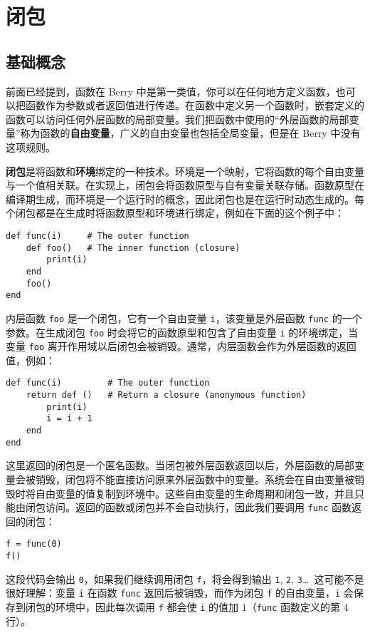 \section{闭包}

\subsection{基础概念}

前面已经提到，函数在 Berry 中是第一类值，你可以在任何地方定义函数，也可以把函数作为参数或者返回值进行传递。在函数中定义另一个函数时，嵌套定义的函数可以访问任何外层函数的局部变量。我们把函数中使用的“外层函数的局部变量”称为函数的\textbf{自由变量}，广义的自由变量也包括全局变量，但是在 Berry 中没有这项规则。

\textbf{闭包}是将函数和\textbf{环境}绑定的一种技术。环境是一个映射，它将函数的每个自由变量与一个值相关联。在实现上，闭包会将函数原型与自有变量关联存储。函数原型在编译期生成，而环境是一个运行时的概念，因此闭包也是在运行时动态生成的。每个闭包都是在生成时将函数原型和环境进行绑定，例如在下面的这个例子中：
\begin{lstlisting}[language=berry]
def func(i)     # The outer function
    def foo()   # The inner function (closure)
        print(i)
    end
    foo()
end
\end{lstlisting}
内层函数 \texttt{foo} 是一个闭包，它有一个自由变量 \texttt{i}，该变量是外层函数 \texttt{func} 的一个参数。在生成闭包 \texttt{foo} 时会将它的函数原型和包含了自由变量 \texttt{i} 的环境绑定，当变量 \texttt{foo} 离开作用域以后闭包会被销毁。通常，内层函数会作为外层函数的返回值，例如：
\begin{lstlisting}[language=berry]
def func(i)         # The outer function
    return def ()   # Return a closure (anonymous function)
        print(i)
        i = i + 1
    end
end
\end{lstlisting}
这里返回的闭包是一个匿名函数。当闭包被外层函数返回以后，外层函数的局部变量会被销毁，闭包将不能直接访问原来外层函数中的变量。系统会在自由变量被销毁时将自由变量的值复制到环境中。这些自由变量的生命周期和闭包一致，并且只能由闭包访问。返回的函数或闭包并不会自动执行，因此我们要调用 \texttt{func} 函数返回的闭包：
\begin{lstlisting}[language=berry]
f = func(0)
f()
\end{lstlisting}
这段代码会输出 \texttt{0}，如果我们继续调用闭包 \texttt{f}，将会得到输出 \texttt{1}, \texttt{2}, \texttt{3}\ldots\ 这可能不是很好理解：变量 \texttt{i} 在函数 \texttt{func} 返回后被销毁，而作为闭包 \texttt{f} 的自由变量，\texttt{i} 会保存到闭包的环境中，因此每次调用 \texttt{f} 都会使 \texttt{i} 的值加 $1$（\texttt{func} 函数定义的第 4 行）。

